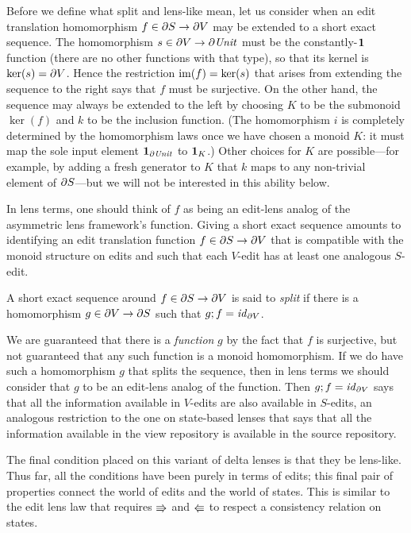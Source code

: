 Before we define what split and lens-like mean, let us consider when an
edit translation homomorphism $f \in \partial S \to \partial V$ may be extended to a short
exact sequence. The homomorphism $s \in \partial V \to \partial\mathit{Unit}$ must be the
constantly-$\mbox{\bf{1}}$ function (there are no other functions with that type), so
that its kernel is $\ker(s)=\partial V$. Hence the restriction $\mathrm{im}(f)=\ker(s)$ that
arises from extending the sequence to the right says that $f$ must be
surjective. On the other hand, the sequence may always be extended to the
left by choosing $K$ to be the submonoid $\ker(f)$ and $k$ to be the
inclusion function. (The homomorphism $i$ is completely determined by the
homomorphism laws once we have chosen a monoid $K$: it must map the sole
input element $\mbox{\bf{1}}_{\partial\mathit{Unit}}$ to $\mbox{\bf{1}}_K$.) Other choices for $K$ are
possible---for example, by adding a fresh generator to $K$ that $k$ maps to
any non-trivial element of $\partial S$---but we will not be interested in this
ability below.

In lens terms, one should think of $f$ as being an edit-lens analog of the
asymmetric lens framework's \GET function. Giving a short exact sequence
amounts to identifying an edit translation function $f\in\partial S\to\partial V$ that is
compatible with the monoid structure on edits and such that each $V$-edit
has at least one analogous $S$-edit.

\begin{definition}
    A short exact sequence around $f\in\partial S\to\partial V$ is said to \emph{split} if
    there is a homomorphism $g\in\partial V\to\partial S$ such that $g;f = \mathit{id}_{\partial V}$.
\end{definition}

We are guaranteed that there is a \emph{function} $g$ by the fact that $f$
is surjective, but not guaranteed that any such function is a monoid
homomorphism. If we do have such a homomorphism $g$ that splits the
sequence, then in lens terms we should consider that $g$ to be an edit-lens
analog of the \PUT function. Then $g;f = \mathit{id}_{\partial V}$ says that all the
information available in $V$-edits are also available in $S$-edits, an
analogous restriction to the one on state-based lenses that says that all
the information available in the view repository is available in the source
repository.

The final condition placed on this variant of delta lenses is that they be
lens-like. Thus far, all the conditions have been purely in terms of edits;
this final pair of properties connect the world of edits and the world of
states. This is similar to the edit lens law that requires $\mathord{\Rrightarrow}$ and
$\mathord{\Lleftarrow}$ to respect a consistency relation on states.

